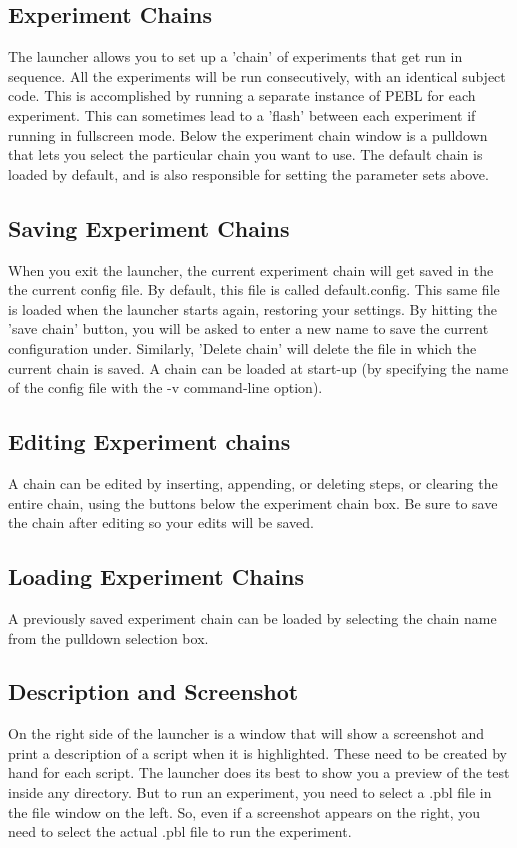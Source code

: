 \subsection{Experiment Chains}
The launcher allows you to set up a 'chain' of experiments that get run in sequence.  All the experiments will be run consecutively, with an identical subject code.  This is accomplished by running a separate instance of PEBL for each experiment.  This can sometimes lead to a 'flash' between each experiment if running in fullscreen mode. 
Below the experiment chain window is a pulldown that lets you select the particular chain you want to use.  The default chain is loaded by default, and is also responsible for setting the parameter sets above.  

\subsection{Saving Experiment Chains}
When you exit the launcher, the current experiment chain will get saved in the the current config file.  By default, this file is called default.config.  This same file is loaded when the launcher starts again, restoring your settings.  By hitting the 'save chain' button, you will be asked to enter a new name to save the current configuration under.  Similarly, 'Delete chain' will delete the file in which the current chain is saved.  A chain can be loaded at start-up (by specifying the name of the config file with the -v command-line option). 

\subsection{Editing Experiment chains}  A chain can be edited by inserting, appending, or deleting steps, or clearing the entire chain, using the buttons below the experiment chain box.  Be sure to save the chain after editing so your edits will be saved.


\subsection{Loading Experiment Chains}
A previously saved experiment chain can be loaded by selecting the chain name from the pulldown selection box. 


\subsection{Description and Screenshot}
On the right side of the launcher is a window that will show a screenshot and print a description of a script when it is highlighted.  These need to be created by hand for each script.  The launcher does its best to show you a preview of the test inside any directory.  But to run an experiment, you need to select a .pbl file in the file window on the left. So, even if a screenshot appears on the right, you need to select the actual .pbl file to run the experiment.


